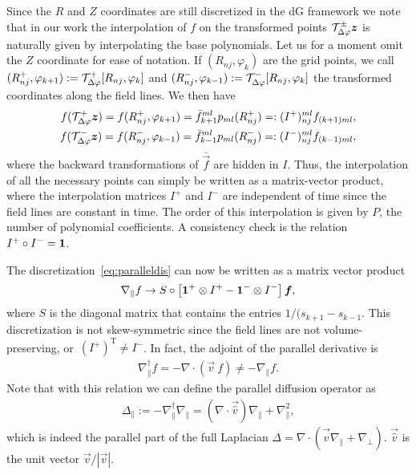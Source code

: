 Since the $R$ and $Z$ coordinates are still discretized in the dG framework we note that in our work
the interpolation of $f$ on the transformed points $\mathcal T^\pm_{\Delta\varphi}{\boldsymbol{z}}$
is naturally given by interpolating the base polynomials.
Let us for a moment omit the $Z$ coordinate for ease of notation.
If $(R_{nj}, \varphi_k)$ are the grid points,
we call $(R^+_{nj}, \varphi_{k+1}) := \mathcal T^+_{\Delta\varphi}[R_{nj}, \varphi_k]$ and
$(R_{nj}^-, \varphi_{k-1}) := \mathcal T^-_{\Delta\varphi}[R_{nj}, \varphi_k]$ the transformed coordinates along
the field lines. We then have
\begin{subequations}
\begin{align}
    f(\mathcal T^+_{\Delta\varphi}{\boldsymbol{z}}) = f( R^+_{nj}, \varphi_{k+1}) = \bar f_{k+1}^{ml}p_{ml}(R^+_{nj}) =: (I^+)_{nj}^{ml}f_{(k+1)ml} , \\
    f(\mathcal T^-_{\Delta\varphi}{\boldsymbol{z}}) = f( R^-_{nj}, \varphi_{k-1}) = \bar f_{k-1}^{ml}p_{ml}(R^-_{nj}) =: (I^-)_{nj}^{ml}f_{(k-1)ml} , 
\end{align}
\label{eq:interpolation}
\end{subequations}
where the backward transformations of $\bar{ \vec f}$ are hidden in $I$.
Thus, the interpolation of all the necessary points can simply be written as a matrix-vector product, where the interpolation matrices $I^+$  and $I^-$ are independent of time since
the field lines are constant in time. The order of this interpolation is given by $P$, the number of polynomial coefficients.
A consistency check is the relation $I^+\circ I^- = \mathbf{1}$.

The discretization~\eqref{eq:paralleldis} can now be written as a matrix vector product
\begin{align}
    \nabla_\parallel f \rightarrow S \circ \left[ \mathbf{1}^+\otimes I^+ - \mathbf{1}^- \otimes I^-  \right] {\boldsymbol{f}}, 
    \label{}
\end{align}
where $S$ is the diagonal matrix that contains the entries $1/(s_{k+1} - s_{k-1}$.
This discretization is not skew-symmetric since the
field lines are not volume-preserving, or~$(I^+)^\mathrm{T} \neq I^-$.
In fact, the adjoint of the parallel derivative is
\begin{align}
    \nabla_\parallel^\dagger f = - \nabla\cdot(\vec v\ f ) \neq -\nabla_\parallel f.
    \label{}
\end{align}
Note that with this relation we can define the parallel
diffusion operator as
\begin{align}
    \Delta_\parallel := -\nabla_\parallel^\dagger \nabla_\parallel = (\nabla\cdot \vec{ \hat v}) \nabla_\parallel + \nabla_\parallel^2 , 
    \label{}
\end{align}
which is indeed the parallel part of the full Laplacian $\Delta = \nabla\cdot( \vec{ \hat v} \nabla_\parallel + \nabla_\perp)$.
$\vec{ \hat v} $ is the unit vector $\vec v/ |\vec v|$.

